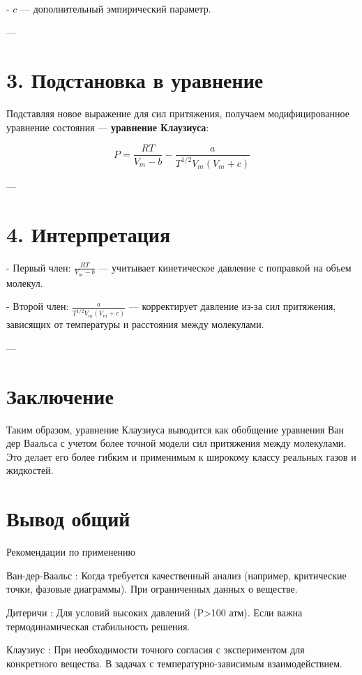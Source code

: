 \documentclass[12pt]{article}
\begin{document}
- $ c $ — дополнительный эмпирический параметр.


---

\section*{3. Подстановка в уравнение}

Подставляя новое выражение для сил притяжения, получаем модифицированное уравнение состояния — \textbf{уравнение Клаузиуса}:

$$
P = \frac{RT}{V_m - b} - \frac{a}{T^{1/2} V_m (V_m + c)}
$$

---

\section*{4. Интерпретация}


    
- Первый член: $ \frac{RT}{V_m - b} $ — учитывает кинетическое давление с поправкой на объем молекул.
    
- Второй член: $ \frac{a}{T^{1/2} V_m (V_m + c)} $ — корректирует давление из-за сил притяжения, зависящих от температуры и расстояния между молекулами.


---

\section*{Заключение}

Таким образом, уравнение Клаузиуса выводится как обобщение уравнения Ван дер Ваальса с учетом более точной модели сил притяжения между молекулами. Это делает его более гибким и применимым к широкому классу реальных газов и жидкостей.


\section*{Вывод общий}

Рекомендации по применению

Ван-дер-Ваальс :
Когда требуется качественный анализ (например, критические точки, фазовые диаграммы).
При ограниченных данных о веществе.

Дитеричи :
Для условий высоких давлений (P>100 атм).
Если важна термодинамическая стабильность решения.

Клаузиус :
При необходимости точного согласия с экспериментом для конкретного вещества.
В задачах с температурно-зависимым взаимодействием.
\end{document}

